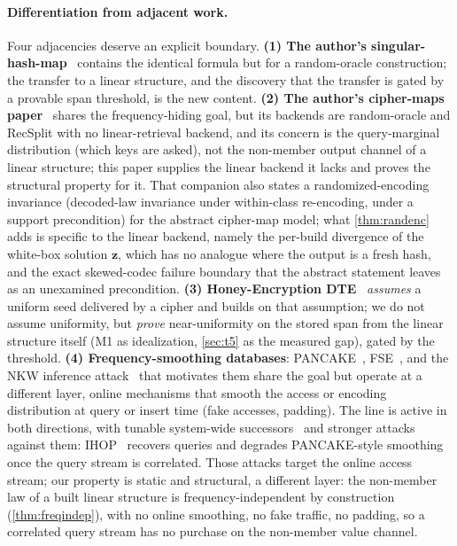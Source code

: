 \documentclass[11pt]{article}
\theoremstyle{definition}
\theoremstyle{plain}
\theoremstyle{remark}
\newcommand{\bz}{\mathbf{z}}                %
\begin{document}
\paragraph{Differentiation from adjacent work.}
Four adjacencies deserve an explicit boundary. \textbf{(1) The author's
singular-hash-map}~\cite{towell_bernoulli_maps} contains the identical formula but for a
random-oracle construction; the transfer to a linear structure, and the discovery that the
transfer is gated by a provable span threshold, is the new content. \textbf{(2) The author's
cipher-maps paper}~\cite{towell2026ciphermaps} shares the frequency-hiding goal, but its
backends are random-oracle and RecSplit with no linear-retrieval backend, and its concern is the
query-marginal distribution (which keys are asked), not the non-member output channel of a
linear structure; this paper supplies the linear backend it lacks and proves the structural
property for it. That companion also states a randomized-encoding invariance (decoded-law
invariance under within-class re-encoding, under a support precondition) for the abstract
cipher-map model; what \cref{thm:randenc} adds is specific to the linear backend, namely the
per-build divergence of the white-box solution $\bz$, which has no analogue where the output is
a fresh hash, and the exact skewed-codec failure boundary that the abstract statement leaves as
an unexamined precondition. \textbf{(3) Honey-Encryption DTE}~\cite{juels2014honey,cheng2019pmte}
\emph{assumes} a uniform seed delivered by a cipher and builds on that assumption; we do not
assume uniformity, but \emph{prove} near-uniformity on the stored span from the linear structure
itself (M1 as idealization, \cref{sec:t5} as the measured gap), gated by the threshold.
\textbf{(4) Frequency-smoothing databases}: PANCAKE~\cite{grubbs2020pancake},
FSE~\cite{lacharite2018fse}, and the NKW inference attack~\cite{naveed2015inference} that
motivates them share the goal but operate at a different layer, online mechanisms that smooth the
access or encoding distribution at query or insert time (fake accesses, padding). The line is
active in both directions, with tunable system-wide successors~\cite{zheng2024swat} and stronger
attacks against them: IHOP~\cite{oya2022ihop} recovers queries and degrades PANCAKE-style
smoothing once the query stream is correlated. Those attacks target the online access stream;
our property is static and structural, a different layer: the non-member law of a built linear
structure is frequency-independent by construction (\cref{thm:freqindep}), with no online
smoothing, no fake traffic, no padding, so a correlated query stream has no purchase on the
non-member value channel.
\end{document}
